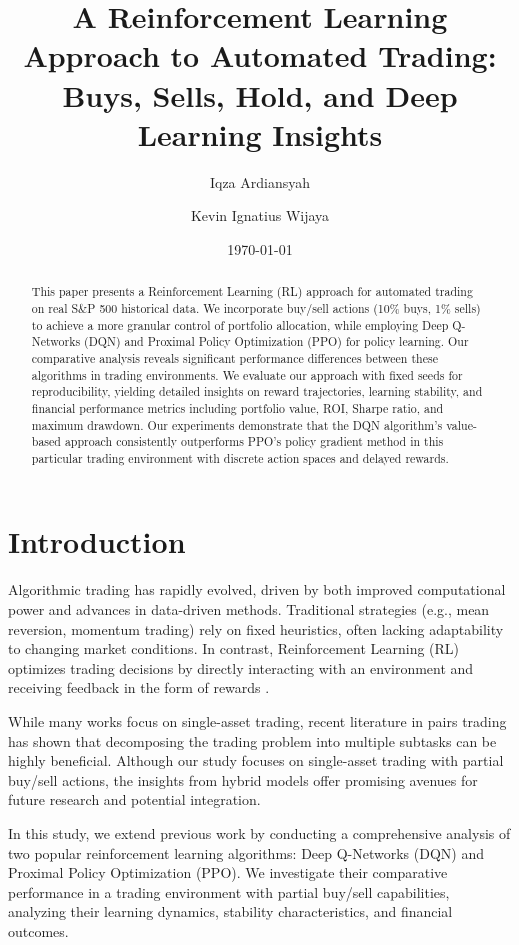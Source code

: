 \documentclass[11pt]{article}
\title{A Reinforcement Learning Approach to Automated Trading: Buys, Sells, Hold, and Deep Learning Insights}
\author[1]{Iqza Ardiansyah}
\author[2]{Kevin Ignatius Wijaya}
\affil[1]{Student ID: 2206810042\\ Faculty of Computer Science, Universitas Indonesia}
\affil[2]{Student ID: 2206083470\\ Faculty of Computer Science, Universitas Indonesia}
\date{\today}
\begin{document}
\maketitle

\begin{abstract}
This paper presents a Reinforcement Learning (RL) approach for automated trading on real S\&P 500 historical data. We incorporate buy/sell actions (10\% buys, 1\% sells) to achieve a more granular control of portfolio allocation, while employing Deep Q-Networks (DQN) and Proximal Policy Optimization (PPO) for policy learning. Our comparative analysis reveals significant performance differences between these algorithms in trading environments. We evaluate our approach with fixed seeds for reproducibility, yielding detailed insights on reward trajectories, learning stability, and financial performance metrics including portfolio value, ROI, Sharpe ratio, and maximum drawdown. Our experiments demonstrate that the DQN algorithm's value-based approach consistently outperforms PPO's policy gradient method in this particular trading environment with discrete action spaces and delayed rewards.
\end{abstract}

\section{Introduction}
Algorithmic trading has rapidly evolved, driven by both improved computational power and advances in data-driven methods. Traditional strategies (e.g., mean reversion, momentum trading) rely on fixed heuristics, often lacking adaptability to changing market conditions. In contrast, Reinforcement Learning (RL) optimizes trading decisions by directly interacting with an environment and receiving feedback in the form of rewards \citep{sutton_2018_irl}.

While many works focus on single-asset trading, recent literature in pairs trading has shown that decomposing the trading problem into multiple subtasks can be highly beneficial. Although our study focuses on single-asset trading with partial buy/sell actions, the insights from hybrid models offer promising avenues for future research and potential integration.

In this study, we extend previous work by conducting a comprehensive analysis of two popular reinforcement learning algorithms: Deep Q-Networks (DQN) and Proximal Policy Optimization (PPO). We investigate their comparative performance in a trading environment with partial buy/sell capabilities, analyzing their learning dynamics, stability characteristics, and financial outcomes.
\end{document}
